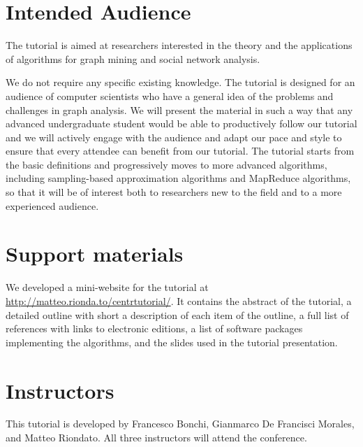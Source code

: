 \documentclass[pdfpagelabels=false]{sig-alternate-2013} %
\begin{document}
\section{Intended Audience}
The tutorial is aimed at researchers interested in the theory and the
applications of algorithms for graph mining and social network analysis.

We do not require any specific existing knowledge. The tutorial is designed for
an audience of computer scientists who have a general idea of the problems and
challenges in graph analysis. We will present the material in such a way that
any advanced undergraduate student would be able to productively follow our
tutorial and we will actively engage with the audience and adapt our pace and
style to ensure that every attendee can benefit from our tutorial.
The tutorial starts from the basic definitions and progressively moves to more advanced
algorithms, including sampling-based approximation algorithms and MapReduce
algorithms, so that it will be of interest both to researchers new
to the field and to a more experienced audience.



\section{Support materials}
We developed a mini-website for the tutorial at
\url{http://matteo.rionda.to/centrtutorial/}. It contains the
abstract of the tutorial, a detailed outline with short a description of
each item of the outline, a full list of references with links to
electronic editions, a list of software packages implementing the
algorithms, and the slides used in the tutorial presentation.

\section{Instructors}
This tutorial is developed by Francesco Bonchi, Gianmarco De Francisci Morales,
and Matteo Riondato. All three instructors will attend the conference.
\end{document}
